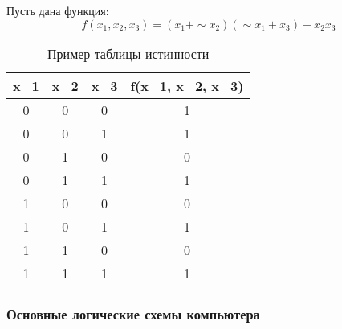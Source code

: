 \begin{eg}
Пусть дана функция:
\[
f(x_1, x_2, x_3) = (x_1 + \sim x_2)(\sim x_1 + x_3) + x_2 x_3
\] 
\end{eg}
\begin{table}[htpb]
  \centering
  \caption{Пример таблицы истинности}
  \label{tab:label}
  \begin{tabular}{ c | c  | c | c }
    x_1 & x_2 & x_3 & f(x_1, x_2, x_3) \\
    \hline 
    0 & 0 & 0 & 1 \\
    0 & 0 & 1 & 1 \\
    0 & 1 & 0 & 0 \\
    0 & 1 & 1 & 1 \\
    1 & 0 & 0 & 0 \\
    1 & 0 & 1 & 1 \\
    1 & 1 & 0 & 0 \\
    1 & 1 & 1 & 1 \\
  \end{tabular}
\end{table}

\subsubsection{Основные логические схемы компьютера}


